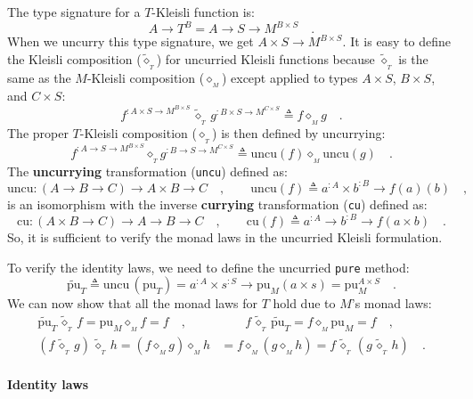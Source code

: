 The type signature for a $T$-Kleisli function is:
\[
A\rightarrow T^{B}=A\rightarrow S\rightarrow M^{B\times S}\quad.
\]
When we uncurry this type signature, we get $A\times S\rightarrow M^{B\times S}$.
It is easy to define the Kleisli composition ($\tilde{\diamond}_{_{T}}$)
for uncurried Kleisli functions because $\tilde{\diamond}_{_{T}}$
is the same as the $M$-Kleisli composition ($\diamond_{_{M}}$) except
applied to types $A\times S$, $B\times S$, and $C\times S$:
\[
f^{:A\times S\rightarrow M^{B\times S}}\,\tilde{\diamond}_{_{T}}\,g^{:B\times S\rightarrow M^{C\times S}}\triangleq f\diamond_{_{M}}g\quad.
\]
The proper $T$-Kleisli composition ($\diamond_{_{T}}$) is then defined
by uncurrying:
\[
f^{:A\rightarrow S\rightarrow M^{B\times S}}\diamond_{_{T}}g^{:B\rightarrow S\rightarrow M^{C\times S}}\triangleq\text{uncu}\left(f\right)\diamond_{_{M}}\text{uncu}\left(g\right)\quad.
\]
The \textbf{uncurrying} transformation (\lstinline!uncu!)
defined as:
\[
\text{uncu}:\left(A\rightarrow B\rightarrow C\right)\rightarrow A\times B\rightarrow C\quad,\quad\quad\text{uncu}\left(f\right)\triangleq a^{:A}\times b^{:B}\rightarrow f(a)(b)\quad,
\]
is an isomorphism with the inverse \textbf{currying}
transformation (\lstinline!cu!) defined as:
\[
\text{cu}:\left(A\times B\rightarrow C\right)\rightarrow A\rightarrow B\rightarrow C\quad,\quad\quad\text{cu}\left(f\right)\triangleq a^{:A}\rightarrow b^{:B}\rightarrow f(a\times b)\quad.
\]
So, it is sufficient to verify the monad laws in the uncurried Kleisli
formulation. 

To verify the identity laws, we need to define the uncurried \lstinline!pure!
method:
\[
\tilde{\text{pu}}_{T}\triangleq\text{uncu}\,(\text{pu}_{T})=a^{:A}\times s^{:S}\rightarrow\text{pu}_{M}(a\times s)=\text{pu}_{M}^{A\times S}\quad.
\]
We can now show that all the monad laws for $T$ hold due to $M$\textsf{'}s
monad laws:
\begin{align*}
\tilde{\text{pu}}_{T}\,\tilde{\diamond}_{_{T}}\,f=\text{pu}_{M}\diamond_{_{M}}f=f\quad, & \quad\quad f\,\tilde{\diamond}_{_{T}}\,\tilde{\text{pu}}_{T}=f\diamond_{_{M}}\text{pu}_{M}=f\quad,\\
(f\,\tilde{\diamond}_{_{T}}\,g)\,\tilde{\diamond}_{_{T}}\,h=(f\diamond_{_{M}}g)\diamond_{_{M}}h & =f\diamond_{_{M}}(g\diamond_{_{M}}h)=f\,\tilde{\diamond}_{_{T}}\,(g\,\tilde{\diamond}_{_{T}}\,h)\quad.
\end{align*}


\paragraph{Identity laws}

